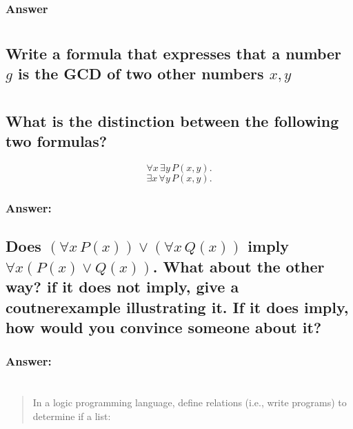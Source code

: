 \documentclass[titlepage]{article}\usepackage[]{graphicx}\usepackage[]{color}
\begin{document}
  \subsubsection{Answer}


  \section{}
  \subsection{Write a formula that expresses that a number $g$ is the GCD of
  two other numbers $x,y$}

  \subsection{}

  \section{}
  \subsection{What is the distinction between the following two formulas?}
  \[ \forall x \, \exists y \, P(x,y). \]
  \[ \exists x \, \forall y \, P(x,y). \]
  \subsubsection{Answer:}



  \subsection{Does $(\forall x \, P(x)) \lor (\forall x \, Q(x))$ imply $\forall
    x (P(x) \lor Q(x))$. What about the other way? if it does not imply, give a
    coutnerexample illustrating it. If it does imply, how would you convince
    someone about it?}
    \subsubsection{Answer:}

\section{ }
  \begin{quote}
    {In a logic programming language, define relations (i.e., write programs)
    to determine if a list:}
  \end{quote}
\end{document}
